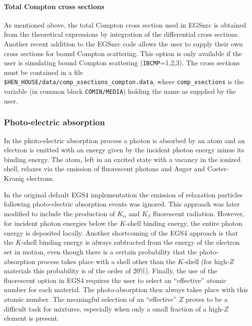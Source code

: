 \paragraph{Total Compton cross sections}\hfill
\label{comp_xsect}

As mentioned above, the total Compton cross section used in EGSnrc is obtained 
from the theoretical expressions by integration of the differential cross sections. 
Another recent addition to the EGSnrc code allows the user to supply their
own cross sections for bound Compton scattering. This option is only available
if the user is simulating bound Compton scattering 
({\tt IBCMP}=1,2,3).  The cross sections
must be contained in a file\\
 {\tt \$HEN\_HOUSE/data/comp\_xsections\_compton.data},
where {\tt comp\_xsections} is the variable 
(in common block {\tt COMIN/MEDIA}) holding the name as supplied
by the user.

\subsubsection{Photo-electric absorption}
\setcounter{equation}{0}
\label{photo}

In the photo-electric absorption process a photon is 
absorbed by an atom and an electron 
is emitted with an energy given by the incident photon 
energy minus its binding energy. 
The atom, left in an excited state with a vacancy in the 
ionized shell, relaxes via the emission of fluorescent photons and 
Auger and Coster-Kronig electrons.  

In the original default EGS4 implementation the emission of relaxation 
particles following photo-electric absorption events was 
ignored. This approach was later modified 
to include the production of $K_\alpha$ and $K_\beta$ fluorescent 
radiation. However, for incident photon energies below 
the $K$-shell binding energy, the entire photon energy is 
deposited locally. Another shortcoming of the EGS4 approach is 
that the $K$-shell binding energy is always subtracted 
from the energy of the electron set in motion, even though there 
is a certain probability that the photo-absorption process 
takes place with a shell other than the $K$-shell (for 
high-$Z$ materials this probability is of the order of 20\%). 
Finally, the use of the fluorescent option in EGS4 requires 
the user to select an ``effective'' atomic number for each 
material. The photo-absorption then always takes place with 
this atomic number. The meaningful selection of an 
``effective'' $Z$ proves to be a difficult task for mixtures, especially 
when only a small fraction of a high-$Z$ element is present.

